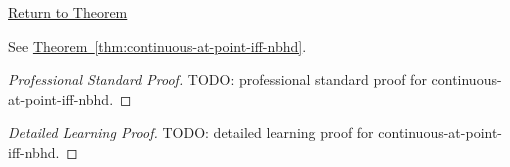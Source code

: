 \newpage
{}
\label{prf:continuous-at-point-iff-nbhd}

\begin{remark*}[Return]
\hyperref[thm:continuous-at-point-iff-nbhd]{Return to Theorem}
\end{remark*}

\begin{theorem*}
See \hyperref[thm:continuous-at-point-iff-nbhd]{Theorem~\ref*{thm:continuous-at-point-iff-nbhd}}.
\end{theorem*}

\begin{proof}[Professional Standard Proof]
\LRAProofBodyStart
TODO: professional standard proof for continuous-at-point-iff-nbhd.
\end{proof}

\begin{proof}[Detailed Learning Proof]
\LRAProofBodyStart
TODO: detailed learning proof for continuous-at-point-iff-nbhd.
\end{proof}

\begin{remark*}
\end{remark*}

\begin{dependencies}
\NoLocalDependencies
\end{dependencies}

\clearpage
